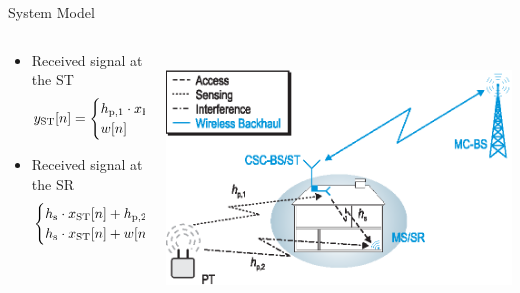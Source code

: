 \documentclass[12pt]{beamer}
\newcounter{theo}[section]
\newenvironment{theo}[1][]{%
\stepcounter{theo}%
\ifstrempty{#1}%
{\mdfsetup{%
frametitle={%
\tikz[baseline=(current bounding box.east),outer sep=0pt]
\node[anchor=east,rectangle,fill=blue!20]
{\strut Theorem~\thetheo};}}
}%
{\mdfsetup{%
frametitle={%
\tikz[baseline=(current bounding box.east),outer sep=0pt]
\node[anchor=east,rectangle,fill=blue!20]
{\strut Theorem~\thetheo:~#1};}}%
}%
\mdfsetup{innertopmargin=10pt,linecolor=blue!20,%
linewidth=2pt,topline=true,
frametitleaboveskip=\dimexpr−\ht\strutbox\relax,}
\begin{mdframed}[]\relax%
}{\end{mdframed}}
\newcommand{\fs}[2]{\fontsize{#1 pt}{#2}\selectfont}
\begin{document}
\begin{frame}{System Model}
        \vspace{-0.8cm}
        \fs{8}{8}
        \begin{columns}[t]
                \begin{column}{0.51 \paperwidth}
		\begin{center}
		\begin{itemize}
                     \item Received signal at the ST
                        \begin{equation*}
                        y_{\text{ST}}[n] = 
                                \begin{cases}
                                h_{\text{p,1}} \cdot x_{\text{PT}}[n] + w[n] & : \mathcal{H}_1 \\
                                w[n] & :\mathcal{H}_0
                                \end{cases}
                        \end{equation*}
                     \item Received signal at the SR
                        \begin{equation*}
                        \begin{cases}
                        h_{\text{s}} \cdot x_{\text{ST}}[n] + h_{\text{p,2}} \cdot x_{\text{PT}}[n] + w[n] & : 1 - \text{P}_{\text{d}} \\
			h_{\text{s}} \cdot x_{\text{ST}}[n] + w[n] & : 1 - \text{P}_{\text{fa}}
			\end{cases}
                        \end{equation*}
		  \end{itemize}
                \end{center}
                \end{column}
                \begin{column}{0.49 \paperwidth}
                \begin{center}
		 \\[0.3cm]
                        \includegraphics[width = 0.38 \paperwidth]{../figures/CR_Scenario_Interweave}

\end{center}
\end{column}
\end{columns}
\end{frame}
\end{document}

